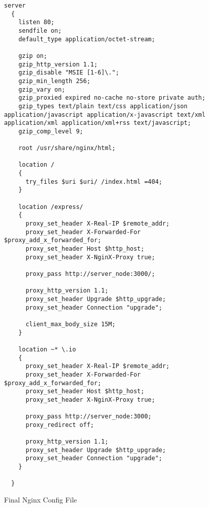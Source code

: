 \begin{figure}[h!]
  \begin{lstlisting}[basicstyle=\tiny, breaklines=true]
  server
  {
    listen 80;
    sendfile on;
    default_type application/octet-stream;

    gzip on;
    gzip_http_version 1.1;
    gzip_disable "MSIE [1-6]\.";
    gzip_min_length 256;
    gzip_vary on;
    gzip_proxied expired no-cache no-store private auth;
    gzip_types text/plain text/css application/json application/javascript application/x-javascript text/xml application/xml application/xml+rss text/javascript;
    gzip_comp_level 9;

    root /usr/share/nginx/html;

    location /
    {
      try_files $uri $uri/ /index.html =404;
    }

    location /express/
    {
      proxy_set_header X-Real-IP $remote_addr;
      proxy_set_header X-Forwarded-For $proxy_add_x_forwarded_for;
      proxy_set_header Host $http_host;
      proxy_set_header X-NginX-Proxy true;

      proxy_pass http://server_node:3000/;

      proxy_http_version 1.1;
      proxy_set_header Upgrade $http_upgrade;
      proxy_set_header Connection "upgrade";

      client_max_body_size 15M;
    }

    location ~* \.io
    {
      proxy_set_header X-Real-IP $remote_addr;
      proxy_set_header X-Forwarded-For $proxy_add_x_forwarded_for;
      proxy_set_header Host $http_host;
      proxy_set_header X-NginX-Proxy true;

      proxy_pass http://server_node:3000;
      proxy_redirect off;

      proxy_http_version 1.1;
      proxy_set_header Upgrade $http_upgrade;
      proxy_set_header Connection "upgrade";
    }

  }
  \end{lstlisting}
  \caption{Final Nginx Config File}
  \label{sample:nginx}
\end{figure}
